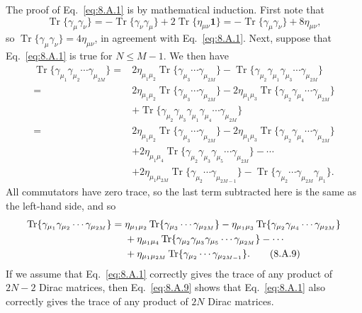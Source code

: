 The proof of Eq.~\eqref{eq:8.A.1} is by mathematical induction. First note that
\[
\operatorname{Tr}\{\gamma_\mu\gamma_\nu\}
=-\operatorname{Tr}\{\gamma_\nu\gamma_\mu\}
+2\operatorname{Tr}\{\eta_{\mu\nu}\mathbf{1}\}
=-\operatorname{Tr}\{\gamma_\mu\gamma_\nu\}+8\eta_{\mu\nu},
\]
so $\operatorname{Tr}\{\gamma_\mu\gamma_\nu\}=4\eta_{\mu\nu}$, in agreement
with Eq.~\eqref{eq:8.A.1}. Next, suppose that Eq.~\eqref{eq:8.A.1} is true for $N\leq M-1$.
We then have
\begin{align*}
\operatorname{Tr}\{\gamma_{\mu_1}\gamma_{\mu_2}\cdots\gamma_{\mu_{2M}}\}
={}&2\eta_{\mu_1\mu_2}
\operatorname{Tr}\{\gamma_{\mu_3}\cdots\gamma_{\mu_{2M}}\}
-\operatorname{Tr}\{\gamma_{\mu_2}\gamma_{\mu_1}
\gamma_{\mu_3}\cdots\gamma_{\mu_{2M}}\}\\
={}&2\eta_{\mu_1\mu_2}
\operatorname{Tr}\{\gamma_{\mu_3}\cdots\gamma_{\mu_{2M}}\}
-2\eta_{\mu_1\mu_3}
\operatorname{Tr}\{\gamma_{\mu_2}\gamma_{\mu_4}\cdots\gamma_{\mu_{2M}}\}\\
&+\operatorname{Tr}\{\gamma_{\mu_2}\gamma_{\mu_3}\gamma_{\mu_1}
\gamma_{\mu_4}\cdots\gamma_{\mu_{2M}}\}\\
={}&2\eta_{\mu_1\mu_2}
\operatorname{Tr}\{\gamma_{\mu_3}\cdots\gamma_{\mu_{2M}}\}
-2\eta_{\mu_1\mu_3}
\operatorname{Tr}\{\gamma_{\mu_2}\gamma_{\mu_4}\cdots\gamma_{\mu_{2M}}\}\\
&+2\eta_{\mu_1\mu_4}
\operatorname{Tr}\{\gamma_{\mu_2}\gamma_{\mu_3}\gamma_{\mu_5}
\cdots\gamma_{\mu_{2M}}\}-\cdots\\
&+2\eta_{\mu_1\mu_{2M}}
\operatorname{Tr}\{\gamma_{\mu_2}\cdots\gamma_{\mu_{2M-1}}\}
-\operatorname{Tr}\{\gamma_{\mu_2}\cdots\gamma_{\mu_{2M}}\gamma_{\mu_1}\}.
\end{align*}
All commutators have zero trace, so the last term subtracted here is the same
as the left-hand side, and so
\begin{align}
\operatorname{Tr}\{\gamma_{\mu_1}\gamma_{\mu_2}\cdots\gamma_{\mu_{2M}}\}
={}&\eta_{\mu_1\mu_2}
\operatorname{Tr}\{\gamma_{\mu_3}\cdots\gamma_{\mu_{2M}}\}
-\eta_{\mu_1\mu_3}
\operatorname{Tr}\{\gamma_{\mu_2}\gamma_{\mu_4}\cdots\gamma_{\mu_{2M}}\}
\notag\\
&+\eta_{\mu_1\mu_4}
\operatorname{Tr}\{\gamma_{\mu_2}\gamma_{\mu_3}\gamma_{\mu_5}
\cdots\gamma_{\mu_{2M}}\}-\cdots
\notag\\
&+\eta_{\mu_1\mu_{2M}}
\operatorname{Tr}\{\gamma_{\mu_2}\cdots\gamma_{\mu_{2M-1}}\}.
\tag{8.A.9}\label{eq:8.A.9}
\end{align}
If we assume that Eq.~\eqref{eq:8.A.1} correctly gives the trace of any product of
$2N-2$ Dirac matrices, then Eq.~\eqref{eq:8.A.9} shows that Eq.~\eqref{eq:8.A.1} also
correctly gives the trace of any product of $2N$ Dirac matrices.

